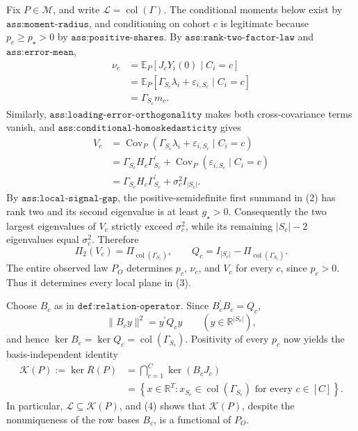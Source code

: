 Fix \(P\in\mathcal M\), and write \(\mathcal L=\operatorname{col}(\Gamma)\). The conditional moments below exist by \(\texttt{ass:moment-radius}\), and conditioning on cohort \(c\) is legitimate because \(p_c\geq p_{\star}>0\) by \(\texttt{ass:positive-shares}\). By \(\texttt{ass:rank-two-factor-law}\) and \(\texttt{ass:error-mean}\),
\[
\begin{aligned}
\nu_c
&=\mathbb E_P[J_cY_i(0)\mid C_i=c]\\
&=\mathbb E_P[\Gamma_{S_c}\lambda_i+\varepsilon_{i,S_c}\mid C_i=c]\\
&=\Gamma_{S_c}m_c.
\end{aligned}
\tag{1}
\]
Similarly, \(\texttt{ass:loading-error-orthogonality}\) makes both cross-covariance terms vanish, and \(\texttt{ass:conditional-homoskedasticity}\) gives
\[
\begin{aligned}
V_c
&=\operatorname{Cov}_P(\Gamma_{S_c}\lambda_i+\varepsilon_{i,S_c}\mid C_i=c)\\
&=\Gamma_{S_c}H_c\Gamma_{S_c}^{\prime}
  +\operatorname{Cov}_P(\varepsilon_{i,S_c}\mid C_i=c)\\
&=\Gamma_{S_c}H_c\Gamma_{S_c}^{\prime}+\sigma_c^2I_{|S_c|}.
\end{aligned}
\tag{2}
\]
By \(\texttt{ass:local-signal-gap}\), the positive-semidefinite first summand in (2) has rank two and its second eigenvalue is at least \(g_{\star}>0\). Consequently the two largest eigenvalues of \(V_c\) strictly exceed \(\sigma_c^2\), while its remaining \(|S_c|-2\) eigenvalues equal \(\sigma_c^2\). Therefore
\[
\Pi_2(V_c)=\Pi_{\operatorname{col}(\Gamma_{S_c})},
\qquad
Q_c=I_{|S_c|}-\Pi_{\operatorname{col}(\Gamma_{S_c})}.
\tag{3}
\]
The entire observed law \(P_O\) determines \(p_c\), \(\nu_c\), and \(V_c\) for every \(c\), since \(p_c>0\). Thus it determines every local plane in (3).

Choose \(B_c\) as in \(\texttt{def:relation-operator}\). Since \(B_c^{\prime}B_c=Q_c\),
\[
\|B_cy\|^2=y^{\prime}Q_cy
\qquad (y\in\mathbb R^{|S_c|}),
\]
and hence \(\ker B_c=\ker Q_c=\operatorname{col}(\Gamma_{S_c})\). Positivity of every \(p_c\) now yields the basis-independent identity
\[
\begin{aligned}
\mathcal K(P):=\ker\overline R(P)
&=\bigcap_{c=1}^C\ker(B_cJ_c)\\
&=\left\{x\in\mathbb R^T:x_{S_c}\in
\operatorname{col}(\Gamma_{S_c})\text{ for every }c\in[C]\right\}.
\end{aligned}
\tag{4}
\]
In particular, \(\mathcal L\subseteq\mathcal K(P)\), and (4) shows that \(\mathcal K(P)\), despite the nonuniqueness of the row bases \(B_c\), is a functional of \(P_O\).

